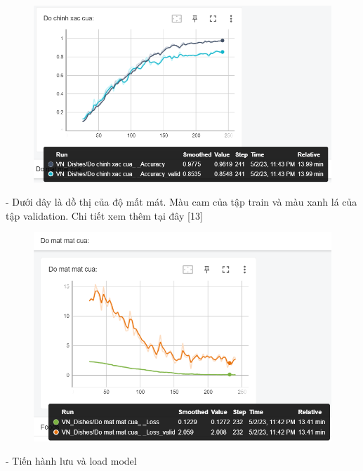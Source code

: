 \documentclass[12pt, a4paper]{article}
\begin{document}
\begin{figure}[h] %
    \centering
    \includegraphics[scale = 0.6]{Img/Dishes/P2.png}
\end{figure}

\par - Dưới dây là dồ thị của độ mất mát. Màu cam của tập train và màu xanh lá của tập validation. Chi tiết xem thêm tại đây [13]
\begin{figure}[h] %
    \centering
    \includegraphics[scale = 0.65]{Img/Dishes/P3.png}
\end{figure}
\par - Tiến hành lưu và load model 
\end{document}
